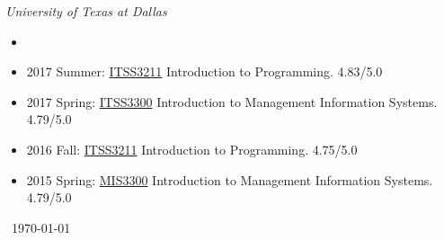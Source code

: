 \documentclass[paper=letter,fontsize=10pt]{scrartcl} %
\newcommand{\NewPart}[2]{\section*{{#1} #2}}
\newcommand{\CourseEntry}[4]{
		\noindent \item{#1: \ul{#2} #3 #4}}
\begin{document}
\vspace{6pt}

\noindent\textit{University of Texas at Dallas}

\begin{itemize}
\vspace{-18pt}
\item[]
\CourseEntry{2017 Summer}{ITSS3211}{Introduction to Programming.}{4.83/5.0}
\CourseEntry{2017 Spring}{ITSS3300}{Introduction to Management Information Systems.}{4.79/5.0}
\CourseEntry{2016 Fall}{ITSS3211}{Introduction to Programming.}{4.75/5.0}
\CourseEntry{2015 Spring}{MIS3300}{Introduction to Management Information Systems.}{4.79/5.0}

\end{itemize}







\vspace{36pt}
{\centering \faCalendarCheckO~\today \par}
\end{document}
